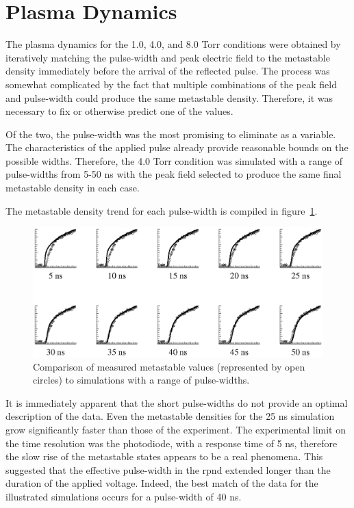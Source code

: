 \section{Plasma Dynamics}

The plasma dynamics for the 1.0, 4.0, and 8.0 Torr conditions were obtained by
iteratively matching the pulse-width and peak electric field to the metastable
density immediately before the arrival of the reflected pulse. The process was
somewhat complicated by the fact that multiple combinations of the peak field
and pulse-width could produce the same metastable density. Therefore, it was
necessary to fix or otherwise predict one of the values.

Of the two, the pulse-width was the most promising to eliminate as a variable.
The characteristics of the applied pulse already provide reasonable bounds on
the possible widths. Therefore, the 4.0 Torr condition was simulated with a
range of pulse-widths from 5-50 ns with the peak field selected to produce the
same final metastable density in each case. 

The metastable density trend for each pulse-width is compiled in
figure~\ref{fig:widths}.
\begin{figure}
  \centering
  \includegraphics{./chapters/modeling/figures/widths.eps}
  \caption{Comparison of measured metastable values (represented by open
    circles) to simulations with a range of pulse-widths.}
  \label{fig:widths}
\end{figure}
It is immediately apparent that the short pulse-widths do not provide an optimal
description of the data. Even the metastable densities for the 25 ns simulation
grow significantly faster than those of the experiment. The experimental limit
on the time resolution was the photodiode, with a response time of 5 ns,
therefore the slow rise of the metastable states appears to be a real phenomena.
This suggested that the effective pulse-width in the \acs{rpnd} extended longer
than the duration of the applied voltage. Indeed, the best match of the data for
the illustrated simulations occurs for a pulse-width of 40 ns.

